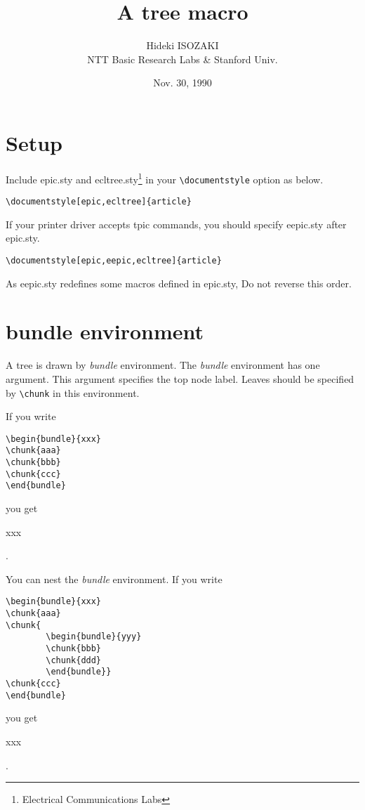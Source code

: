 
\title{A tree macro}

\author{Hideki ISOZAKI\\NTT Basic Research Labs \& Stanford Univ.}

\date{Nov. 30, 1990}


\addtolength{\textwidth}{12pt}



\maketitle


\section{Setup}

Include epic.sty and ecltree.sty\footnote{Electrical Communications Labs}
in your \verb|\documentstyle|
option as below.
\begin{verbatim}
\documentstyle[epic,ecltree]{article}
\end{verbatim}
If your printer driver accepts tpic commands,
you should specify eepic.sty after epic.sty.
\begin{verbatim}
\documentstyle[epic,eepic,ecltree]{article}
\end{verbatim}
As eepic.sty redefines some macros defined in epic.sty,
Do not reverse this order.

\section{bundle environment}

A tree is drawn by {\it bundle} environment.
The {\it bundle} environment has one argument.
This argument specifies the top node label.
Leaves should be specified by \verb|\chunk| in this environment.

If you write
\begin{verbatim}
\begin{bundle}{xxx}
\chunk{aaa}
\chunk{bbb}
\chunk{ccc}
\end{bundle}
\end{verbatim}
you get
\begin{bundle}{xxx}
\end{bundle}.

You can nest the {\it bundle} environment.
If you write
\begin{verbatim}
\begin{bundle}{xxx}
\chunk{aaa}
\chunk{
        \begin{bundle}{yyy}
        \chunk{bbb}
        \chunk{ddd}
        \end{bundle}}
\chunk{ccc}
\end{bundle}
\end{verbatim}
you get
\begin{bundle}{xxx}
\end{bundle}.

